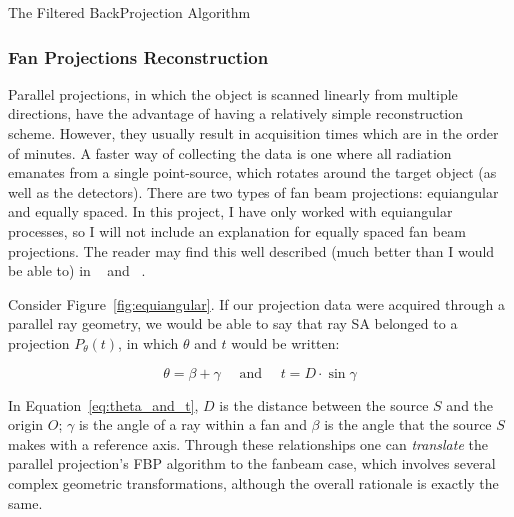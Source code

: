\begin{algorithm}
    \caption{The Filtered BackProjection Algorithm}
    \label{alg:fbp}
    \begin{algorithmic}
    \ENDFOR
    \end{algorithmic}
\end{algorithm}

\subsubsection{Fan Projections Reconstruction}%
\label{ssub:fan_projections_reconstruction}

Parallel projections, in which the object is scanned linearly from
multiple directions, have the advantage of having a relatively simple
reconstruction scheme. However, they usually result in acquisition times
which are in the order of minutes. A faster way of collecting the data
is one where all radiation emanates from a single point-source, which
rotates around the target object (as well as the detectors). There are
two types of fan beam projections: equiangular and equally spaced. In
this project, I have only worked with equiangular processes, so I will
not include an explanation for equally spaced fan beam projections. The
reader may find this well described (much better than I would be able
to) in ~\cite{Kak2001} and ~\cite{Herman1973}.

Consider Figure~\ref{fig:equiangular}. If our projection data were
acquired through a parallel ray geometry, we would be able to say that
ray SA belonged to a projection $P_{\theta}(t)$, in which $\theta$ and
$t$ would be written:

\begin{equation}
    \label{eq:theta_and_t}
    \theta = \beta + \gamma \quad \text{ and } \quad t = D \cdot \sin \gamma
\end{equation}

In Equation~\ref{eq:theta_and_t}, $D$ is the distance between the source
$S$ and the origin $O$; $\gamma$ is the angle of a ray within a fan and
$\beta$ is the angle that the source $S$ makes with a reference axis.
Through these relationships one can \emph{translate} the parallel
projection's FBP algorithm to the fanbeam case, which involves several
complex geometric transformations, although the overall rationale is
exactly the same.

